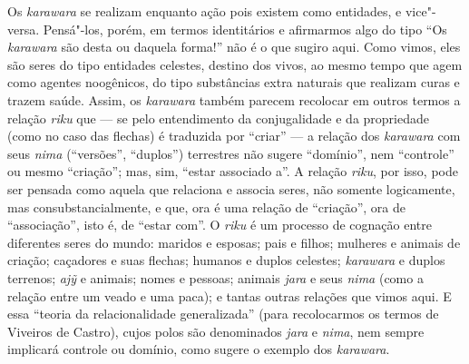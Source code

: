 Os \emph{karawara} se realizam enquanto ação pois existem como
entidades, e vice"-versa. Pensá"-los, porém, em termos identitários e
afirmarmos algo do tipo ``Os \emph{karawara} são desta ou daquela forma!''
não é o que sugiro aqui. Como vimos, eles são seres do tipo entidades
celestes, destino dos vivos, ao mesmo tempo que agem como agentes
noogênicos, do tipo substâncias extra naturais que realizam curas e
trazem saúde. Assim, os \emph{karawara} também parecem recolocar em
outros termos a relação \emph{riku} que --- se pelo entendimento da
conjugalidade e da propriedade (como no caso das flechas) é traduzida
por ``criar'' --- a relação dos \emph{karawara} com seus \emph{nima}
(``versões'', ``duplos'') terrestres não sugere ``domínio'', nem ``controle'' ou
mesmo ``criação''; mas, sim, ``estar associado a''. A relação \emph{riku},
por isso, pode ser pensada como aquela que relaciona e associa seres,
não somente logicamente, mas consubstancialmente, e que, ora é uma
relação de ``criação'', ora de ``associação'', isto é, de ``estar com''. O
\emph{riku} é um processo de cognação entre diferentes seres do mundo:
maridos e esposas; pais e filhos; mulheres e animais de criação;
caçadores e suas flechas; humanos e duplos celestes; \emph{karawara} e
duplos terrenos; \emph{ajỹ} e animais; nomes e pessoas; animais
\emph{jara} e seus \emph{nima} (como a relação entre um veado e uma
paca); e tantas outras relações que vimos aqui. E essa ``teoria da
relacionalidade generalizada'' (para recolocarmos os termos de Viveiros
de Castro), cujos polos são denominados \emph{jara} e \emph{nima}, nem
sempre implicará controle ou domínio, como sugere o exemplo dos
\emph{karawara}.

